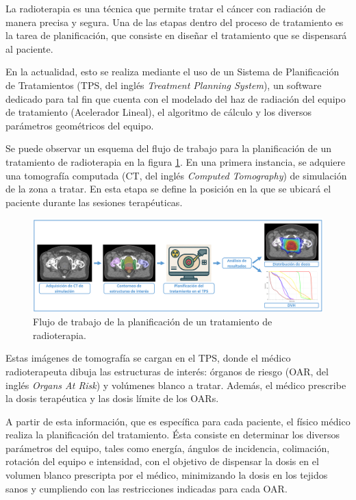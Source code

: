 \documentclass[
11pt, %
codirector, %
]{charter}
\begin{document}
La radioterapia es una técnica que permite tratar el cáncer con radiación de manera precisa y segura. Una de las etapas dentro del proceso de tratamiento es la tarea de planificación, que consiste en diseñar el tratamiento que se dispensará al paciente.

En la actualidad, esto se realiza mediante el uso de un Sistema de Planificación de Tratamientos (TPS, del inglés \textit{Treatment Planning System}), un software dedicado para tal fin que cuenta con el modelado del haz de radiación del equipo de tratamiento (Acelerador Lineal), el algoritmo de cálculo y los diversos parámetros geométricos del equipo. 

Se puede observar un esquema del flujo de trabajo para la planificación de un tratamiento de radioterapia en la figura \ref{fig:FlujoTrabajo}. En una primera instancia, se adquiere una tomografía computada (CT, del inglés \textit{Computed Tomography}) de simulación de la zona a tratar. En esta etapa se define la posición en la que se ubicará el paciente durante las sesiones terapéuticas.

\vspace{10px}

\begin{figure}[H]
\centering 
\includegraphics[width=1\textwidth]{./Figuras/Fig1-FlujoDeTrabajo.png}
\caption{Flujo de trabajo de la planificación de un tratamiento de radioterapia.}
\label{fig:FlujoTrabajo}
\end{figure}

\vspace{10px}

Estas imágenes de tomografía se cargan en el TPS, donde el médico radioterapeuta dibuja las estructuras de interés: órganos de riesgo (OAR, del inglés \textit{Organs At Risk}) y volúmenes blanco a tratar. Además, el médico prescribe la dosis terapéutica y las dosis límite de los OARs. 

A partir de esta información, que es específica para cada paciente, el físico médico realiza la planificación del tratamiento. Ésta consiste en determinar los diversos parámetros del equipo, tales como energía, ángulos de incidencia, colimación, rotación del equipo e intensidad, con el objetivo de dispensar la dosis en el volumen blanco prescripta por el médico, minimizando la dosis en los tejidos sanos y cumpliendo con las restricciones indicadas para cada OAR.
\end{document}
